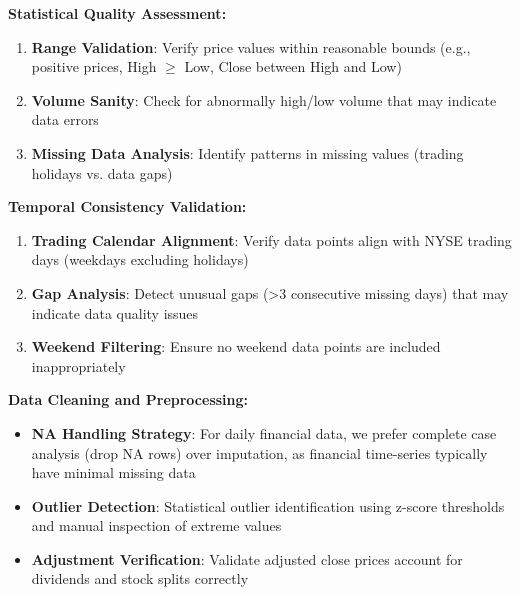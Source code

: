 \documentclass[conference]{IEEEtran}
\begin{document}
\textbf{Statistical Quality Assessment:}
\begin{enumerate}
  \item \textbf{Range Validation}: Verify price values within reasonable bounds (e.g., positive prices, High $\geq$ Low, Close between High and Low)
  \item \textbf{Volume Sanity}: Check for abnormally high/low volume that may indicate data errors
  \item \textbf{Missing Data Analysis}: Identify patterns in missing values (trading holidays vs. data gaps)
\end{enumerate}

\textbf{Temporal Consistency Validation:}
\begin{enumerate}
  \item \textbf{Trading Calendar Alignment}: Verify data points align with NYSE trading days (weekdays excluding holidays)
  \item \textbf{Gap Analysis}: Detect unusual gaps (>3 consecutive missing days) that may indicate data quality issues
  \item \textbf{Weekend Filtering}: Ensure no weekend data points are included inappropriately
\end{enumerate}

\textbf{Data Cleaning and Preprocessing:}
\begin{itemize}
  \item \textbf{NA Handling Strategy}: For daily financial data, we prefer complete case analysis (drop NA rows) over imputation, as financial time-series typically have minimal missing data
  \item \textbf{Outlier Detection}: Statistical outlier identification using z-score thresholds and manual inspection of extreme values
  \item \textbf{Adjustment Verification}: Validate adjusted close prices account for dividends and stock splits correctly
\end{itemize}
\end{document}
